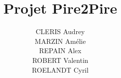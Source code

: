\documentclass{beamer}
\begin{document}
\title{Projet Pire2Pire}
\author {
CLERIS Audrey        \\
MARZIN Amélie        \\
REPAIN Alex          \\
ROBERT Valentin      \\
ROELANDT Cyril
}


\begin{frame}
\titlepage
\end{frame}
\end{document}
